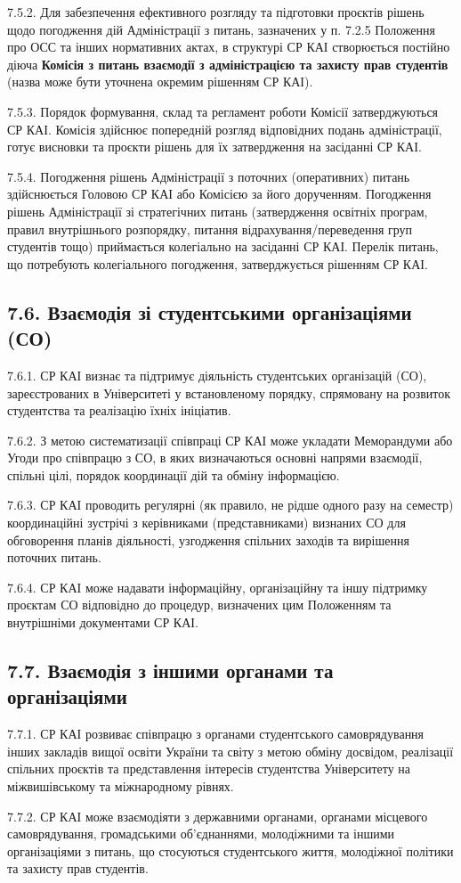     7.5.2. Для забезпечення ефективного розгляду та підготовки проєктів рішень щодо погодження дій Адміністрації з питань, зазначених у п. 7.2.5 Положення про ОСС та інших нормативних актах, в структурі СР КАІ створюється постійно діюча \textbf{Комісія з питань взаємодії з адміністрацією та захисту прав студентів} (назва може бути уточнена окремим рішенням СР КАІ).

    7.5.3. Порядок формування, склад та регламент роботи Комісії затверджуються СР КАІ. Комісія здійснює попередній розгляд відповідних подань адміністрації, готує висновки та проєкти рішень для їх затвердження на засіданні СР КАІ.

    7.5.4. Погодження рішень Адміністрації з поточних (оперативних) питань здійснюється Головою СР КАІ або Комісією за його дорученням. Погодження рішень Адміністрації зі стратегічних питань (затвердження освітніх програм, правил внутрішнього розпорядку, питання відрахування/переведення груп студентів тощо) приймається колегіально на засіданні СР КАІ. Перелік питань, що потребують колегіального погодження, затверджується рішенням СР КАІ.

\subsection*{7.6. Взаємодія зі студентськими організаціями (СО)}
    7.6.1. СР КАІ визнає та підтримує діяльність студентських організацій (СО), зареєстрованих в Університеті у встановленому порядку, спрямовану на розвиток студентства та реалізацію їхніх ініціатив.

    7.6.2. З метою систематизації співпраці СР КАІ може укладати Меморандуми або Угоди про співпрацю з СО, в яких визначаються основні напрями взаємодії, спільні цілі, порядок координації дій та обміну інформацією.

    7.6.3. СР КАІ проводить регулярні (як правило, не рідше одного разу на семестр) координаційні зустрічі з керівниками (представниками) визнаних СО для обговорення планів діяльності, узгодження спільних заходів та вирішення поточних питань.

    7.6.4. СР КАІ може надавати інформаційну, організаційну та іншу підтримку проєктам СО відповідно до процедур, визначених цим Положенням та внутрішніми документами СР КАІ.

\subsection*{7.7. Взаємодія з іншими органами та організаціями}
    7.7.1. СР КАІ розвиває співпрацю з органами студентського самоврядування інших закладів вищої освіти України та світу з метою обміну досвідом, реалізації спільних проєктів та представлення інтересів студентства Університету на міжвишівському та міжнародному рівнях.

    7.7.2. СР КАІ може взаємодіяти з державними органами, органами місцевого самоврядування, громадськими об'єднаннями, молодіжними та іншими організаціями з питань, що стосуються студентського життя, молодіжної політики та захисту прав студентів. 